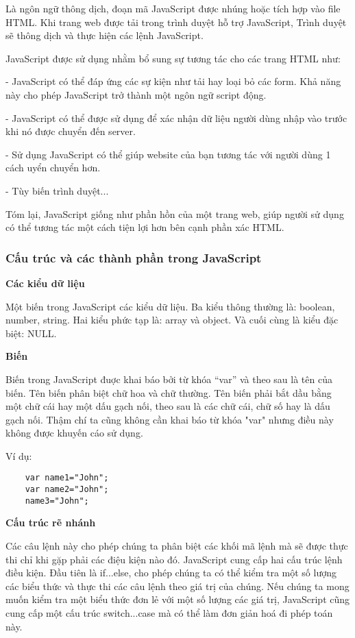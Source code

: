 Là ngôn ngữ thông dịch, đoạn mã JavaScript được nhúng hoặc tích hợp vào file HTML. Khi trang web được tải trong trình duyệt hỗ trợ JavaScript, Trình duyệt sẽ thông dịch và thực hiện các lệnh JavaScript.

JavaScript được sử dụng nhằm bổ sung sự tương tác cho các trang HTML như:

\quad - JavaScript có thể đáp ứng các sự kiện như tải hay loại bỏ các form. Khả năng này cho phép JavaScript trở thành một ngôn ngữ script động.

\quad - JavaScript có thể được sử dụng để xác nhận dữ liệu người dùng nhập vào trước khi nó được chuyển đến server.

\quad - Sử dụng JavaScript có thể giúp website của bạn tương tác với người dùng 1 cách uyển chuyển hơn.

\quad - Tùy biến trình duyệt...

Tóm lại, JavaScript giống như phần hồn của một trang web, giúp người sử dụng có thể tương tác một cách tiện lợi hơn bên cạnh phần xác HTML.


\subsubsection{Cấu trúc và các thành phần trong JavaScript}
\textbf{Các kiểu dữ liệu}

Một biến trong JavaScript các kiểu dữ liệu. Ba kiểu thông thường là: boolean, number, string. Hai kiểu phức tạp là: array và object. Và cuối cùng là kiểu đặc biệt: NULL.

\textbf{Biến}

Biến trong JavaScript đuợc khai báo bởi từ khóa “var” và theo sau là tên của biến. Tên biến phân biệt chữ hoa và chữ thường. Tên biến phải bắt dầu bằng một chữ cái hay một dấu gạch nối, theo sau là các chữ cái, chữ số hay là dấu gạch nối. Thậm chí ta cũng không cần khai báo từ khóa "var" nhưng điều này không được khuyến cáo sử dụng.
  
Ví dụ:  
\begin{lstlisting}
	var name1="John";
	var name2="John";
	name3="John";
\end{lstlisting}


\textbf{Cấu trúc rẽ nhánh}

Các câu lệnh này cho phép chúng ta phân biệt các khối mã lệnh mà sẽ được thực thi chỉ khi gặp phải các điệu kiện nào đó. JavaScript cung cấp hai cấu trúc lệnh điều kiện. Đầu tiên là if...else, cho phép chúng ta có thể kiểm tra một số lượng các biểu thức và thực thi các câu lệnh theo giá trị của chúng. Nếu chúng ta mong muốn kiểm tra một biểu thức đơn lẻ với một số lượng các giá trị, JavaScript cũng cung cấp một cấu trúc switch...case mà có thể làm đơn giản hoá đi phép toán này.
 
